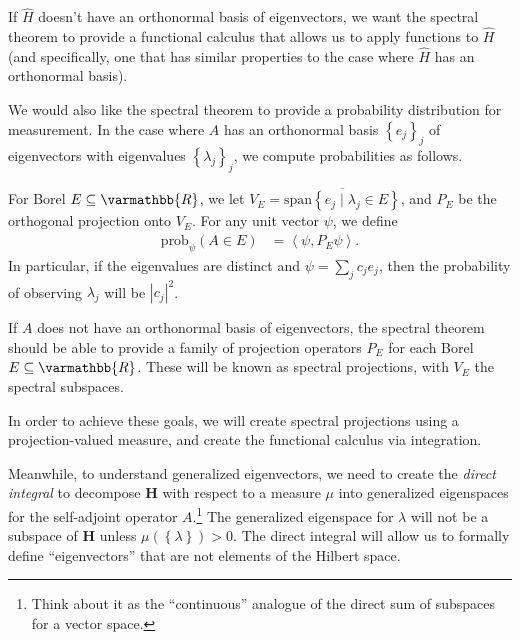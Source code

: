 \documentclass[12pt]{extarticle}
\newcommand{\R}{\varmathbb{R}}
\newcommand{\set}[1]{\left\{#1\right\}}
\newcommand{\iprod}[2]{\left\langle #1,#2\right\rangle}
\theoremstyle{plain}
\theoremstyle{definition}
\theoremstyle{remark}
\renewcommand{\newline}{\hfill\break}
\begin{document}
  If $\hat{H}$ doesn't have an orthonormal basis of eigenvectors, we want the spectral theorem to provide a functional calculus that allows us to apply functions to $\hat{H}$ (and specifically, one that has similar properties to the case where $\hat{H}$ has an orthonormal basis).\newline

  We would also like the spectral theorem to provide a probability distribution for measurement. In the case where $A$ has an orthonormal basis $\set{e_j}_j$ of eigenvectors with eigenvalues $\set{\lambda_j}_j$, we compute probabilities as follows. \newline

  For Borel $E\subseteq \R$, we let $V_E = \overline{\text{span}\set{e_j\mid \lambda_j\in E}}$, and $P_E$ be the orthogonal projection onto $V_E$. For any unit vector $\psi$, we define
  \begin{align*}
    \text{prob}_{\psi}(A\in E) &= \iprod{\psi}{P_E\psi}.
  \end{align*}
  In particular, if the eigenvalues are distinct and $\psi = \sum_{j}c_je_j$, then the probability of observing $\lambda_j$ will be $|c_j|^2$.\newline

  If $A$ does not have an orthonormal basis of eigenvectors, the spectral theorem should be able to provide a family of projection operators $P_E$ for each Borel $E\subseteq \R$. These will be known as spectral projections, with $V_E$ the spectral subspaces.\newline

  In order to achieve these goals, we will create spectral projections using a projection-valued measure, and create the functional calculus via integration.\newline

  Meanwhile, to understand generalized eigenvectors, we need to create the \textit{direct integral} to decompose $\mathbf{H}$ with respect to a measure $\mu$ into generalized eigenspaces for the self-adjoint operator $A$.\footnote{Think about it as the ``continuous'' analogue of the direct sum of subspaces for a vector space.} The generalized eigenspace for $\lambda$ will not be a subspace of $\mathbf{H}$ unless $\mu\left(\set{\lambda}\right) > 0$. The direct integral will allow us to formally define ``eigenvectors'' that are not elements of the Hilbert space.
\end{document}
